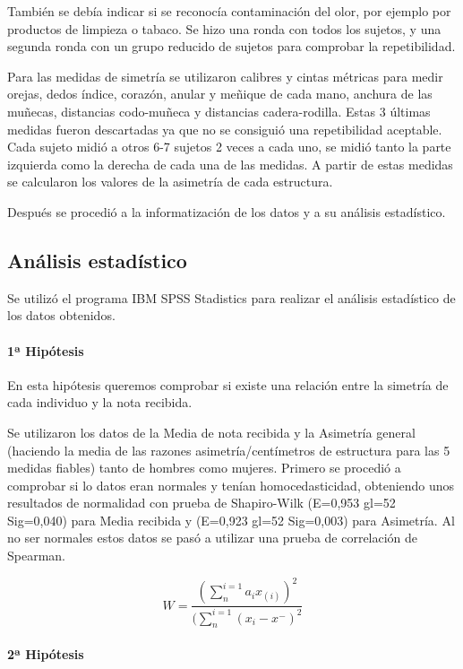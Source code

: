 \documentclass[fleqn,10pt]{SelfArx} %
\begin{document}
También se debía indicar si se reconocía contaminación del olor, por ejemplo por productos de limpieza o tabaco.
Se hizo una ronda con todos los sujetos, y una segunda ronda con un grupo reducido de sujetos para comprobar la repetibilidad.

Para las medidas de simetría se utilizaron calibres y cintas métricas para medir orejas, dedos índice, corazón, anular y meñique de cada mano, anchura de las muñecas, distancias codo-muñeca y distancias cadera-rodilla. Estas 3 últimas medidas fueron descartadas ya que no se consiguió una repetibilidad aceptable. Cada sujeto midió a otros 6-7 sujetos 2 veces a cada uno, se midió tanto la parte izquierda como la derecha de cada una de las medidas. A partir de estas medidas se calcularon los valores de la asimetría de cada estructura.

Después se procedió a la informatización de los datos y a su análisis estadístico.

\subsection{Análisis estadístico}

Se utilizó el programa IBM SPSS Stadistics para realizar el análisis estadístico de los datos obtenidos.

\paragraph{1ª Hipótesis} 

En esta hipótesis queremos comprobar si existe una relación entre la simetría de cada individuo y la nota recibida.

Se utilizaron los datos de la Media de nota recibida y la Asimetría general (haciendo la media de las razones asimetría/centímetros de estructura para las 5 medidas fiables) tanto de hombres como mujeres. Primero se procedió a comprobar si lo datos eran normales y tenían homocedasticidad, obteniendo unos resultados de normalidad con prueba de Shapiro-Wilk (E=0,953 gl=52 Sig=0,040) para Media recibida y (E=0,923 gl=52 Sig=0,003) para Asimetría. Al no ser normales estos datos se pasó a utilizar una prueba de correlación de Spearman.

\begin{equation}
W =\frac{(\sum_{n}^{i=1} a_{i}x_{(i)})^2}{(\sum_{n}^{i=1}(x_{i}-x^{-})^2}
\end{equation}

\paragraph{2ª Hipótesis} 
\end{document}
